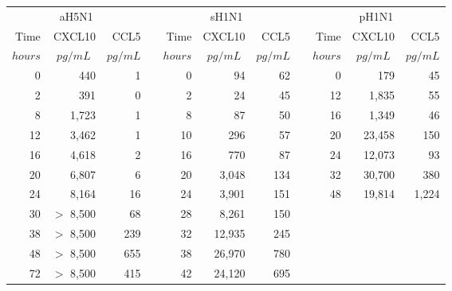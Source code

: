 \documentclass[preprint,10pt,authoryear]{elsarticle}
\begin{document}

\renewcommand{\thetable}{S\arabic{table}}

\begin{table}[!ht]
\begin{center}
\begin{tabular}{| r r r | c | r r r | c | r r r |}
  \multicolumn{3}{c}{aH5N1} & \multicolumn{1}{c}{} & \multicolumn{3}{c}{sH1N1} & \multicolumn{1}{c}{} & \multicolumn{3}{c}{pH1N1}\\
  \cline{1-3} \cline{5-7} \cline{9-11}
  Time & CXCL10 & CCL5 & & Time & CXCL10 & CCL5 & & Time & CXCL10 & CCL5 \\
   \multicolumn{1}{|c}{\footnotesize{$hours$}} & \multicolumn{1}{c}{\footnotesize{$pg/mL$}} & \multicolumn{1}{c|}{\footnotesize{$pg/mL$}} & & \multicolumn{1}{c}{\footnotesize{$hours$}} & \multicolumn{1}{c}{\footnotesize{$pg/mL$}} & \multicolumn{1}{c|}{\footnotesize{$pg/mL$}} & & \multicolumn{1}{c}{\footnotesize{$hours$}} & \multicolumn{1}{c}{\footnotesize{$pg/mL$}} & \multicolumn{1}{c|}{\footnotesize{$pg/mL$}}\\
  \cline{1-3} \cline{5-7} \cline{9-11}
  0 & 440 & 1 & & 0 & 94 & 62 & & 0 & 179 & 45  \\
  2 & 391 & 0 & & 2 & 24 & 45 & & 12 & 1,835 & 55 \\
  8 & 1,723 & 1 & & 8 & 87 & 50 & & 16 & 1,349 & 46 \\
  12 & 3,462 & 1 & & 10 & 296 & 57 & & 20 & 23,458 & 150 \\
  16 & 4,618 & 2 & & 16 & 770 & 87 & & 24 & 12,073 & 93 \\
  20 & 6,807 & 6 & & 20 & 3,048 & 134 & & 32 & 30,700 & 380 \\
  24 & 8,164 & 16 & & 24 & 3,901 & 151 & & 48 & 19,814 & 1,224  \\
  30 & $>$ 8,500 & 68 & & 28 & 8,261 & 150 &  &  &  &  \\
  38 & $>$ 8,500 & 239 & & 32 & 12,935 & 245 &  &  &  &  \\
  48 & $>$ 8,500 & 655 & & 38 & 26,970 & 780 &  &  &  &  \\
  72 & $>$ 8,500 & 415 & & 42 & 24,120 & 695 &  &  &  &  \\

\end{tabular}
\end{center}
\end{table}
\end{document}

